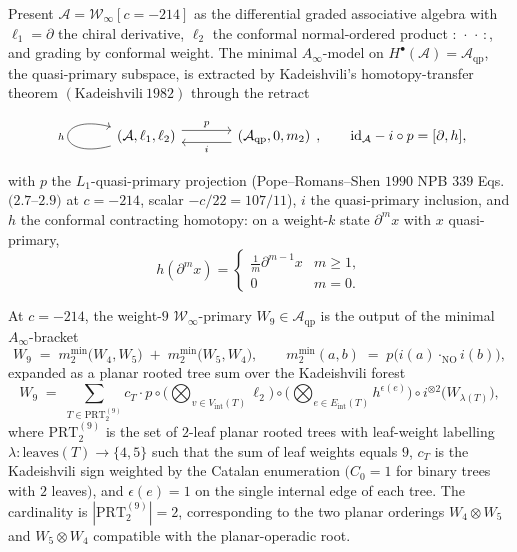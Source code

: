 Present $\mathcal A=\mathcal W_\infty[c=-214]$ as the differential
graded associative algebra with $\ell_1=\partial$ the chiral
derivative, $\ell_2$ the conformal normal-ordered product
${:}\,\cdot\,\cdot\,{:}$, and grading by conformal weight. The
minimal $A_\infty$-model on $H^\bullet(\mathcal A)=\mathcal
A_{\mathrm{qp}}$, the quasi-primary subspace, is extracted by
Kadeishvili's homotopy-transfer theorem
$(\mathrm{Kadeishvili}~1982)$ through the retract
\begin{equation}
\label{eq:kadeishvili-retract-winf}
\begin{tikzcd}[column sep=large]
(\mathcal A,\ell_1,\ell_2) \arrow[r, shift left=1ex, "p"] \arrow[loop left, "h"]
& (\mathcal A_{\mathrm{qp}},0,m_2) \arrow[l, shift left=1ex, "i"]
\end{tikzcd},
\qquad
\mathrm{id}_{\mathcal A}-i\circ p=[\partial,h],
\end{equation}
with $p$ the $L_1$-quasi-primary projection (Pope--Romans--Shen
$1990$ NPB $339$ Eqs.~$(2.7$--$2.9)$ at $c=-214$, scalar $-c/22=107/11$),
$i$ the quasi-primary inclusion, and $h$ the conformal contracting
homotopy: on a weight-$k$ state $\partial^m x$ with $x$ quasi-primary,
\begin{equation}
\label{eq:h-homotopy-winf}
h(\partial^m x)=
\begin{cases}
\tfrac{1}{m}\partial^{m-1}x & m\ge 1,\\[2pt]
0 & m=0.
\end{cases}
\end{equation}

\begin{theorem}
\label{thm:kadeishvili-w9-vol3}
At $c=-214$, the weight-$9$ $\mathcal W_\infty$-primary $W_9\in
\mathcal A_{\mathrm{qp}}$ is the output of the minimal
$A_\infty$-bracket
\begin{equation}
\label{eq:m2-w9-tree}
W_9 \;=\; m_2^{\mathrm{min}}\!\bigl(W_4,W_5\bigr)
\;+\;
m_2^{\mathrm{min}}\!\bigl(W_5,W_4\bigr),
\qquad
m_2^{\mathrm{min}}(a,b)
\;=\;
p\!\bigl(i(a)\cdot_{\mathrm{NO}} i(b)\bigr),
\end{equation}
expanded as a planar rooted tree sum over the Kadeishvili forest
\begin{equation}
\label{eq:kadeishvili-w9-tree-sum}
W_9
\;=\;
\sum_{T\in\mathrm{PRT}_2^{(9)}}
c_T\cdot
p\circ\bigl(\bigotimes_{v\in V_{\mathrm{int}}(T)} \ell_2\bigr)
\circ\bigl(\bigotimes_{e\in E_{\mathrm{int}}(T)} h^{\epsilon(e)}\bigr)
\circ i^{\otimes 2}\bigl(W_{\lambda(T)}\bigr),
\end{equation}
where $\mathrm{PRT}_2^{(9)}$ is the set of $2$-leaf planar rooted
trees with leaf-weight labelling $\lambda\colon\mathrm{leaves}(T)\to
\{4,5\}$ such that the sum of leaf weights equals $9$, $c_T$ is the
Kadeishvili sign weighted by the Catalan enumeration $(C_0=1$ for
binary trees with $2$ leaves$)$, and $\epsilon(e)=1$ on the single
internal edge of each tree. The cardinality is
$|\mathrm{PRT}_2^{(9)}|=2$, corresponding to the two planar orderings
$W_4\otimes W_5$ and $W_5\otimes W_4$ compatible with the
planar-operadic root.
\end{theorem}

